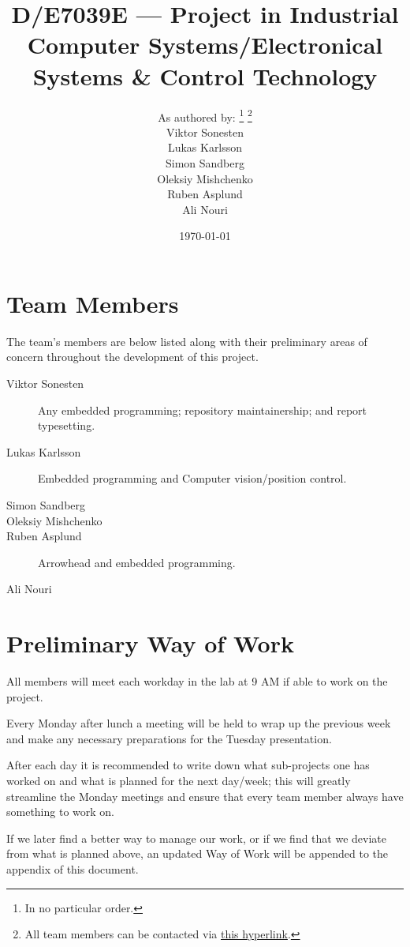 \documentclass[twocolumn]{article}
\title{D/E7039E --- Project in Industrial Computer Systems/Electronical Systems \& Control Technology}
\author{
As authored by:
\footnote{In no particular order.}
\footnote{All team members can be contacted via
\href{mailto:vikson-6@student.ltu.se;lukkar-4@student.ltu.se;simpen-1@student.ltu.se;olemis-6@student.ltu.se;rubasp-6@student.ltu.se;alinou-6@student.ltu.se}{this hyperlink}.} \\
Viktor Sonesten \hypermail{vikson-6@student.ltu.se} \\
Lukas Karlsson \hypermail{lukkar-4@student.ltu.se} \\
Simon Sandberg \hypermail{simpen-1@student.ltu.se} \\
Oleksiy Mishchenko \hypermail{olemis-6@student.ltu.se} \\
Ruben Asplund \hypermail{rubasp-6@student.ltu.se} \\
Ali Nouri \hypermail{alinou-6@student.ltu.se}
}
\date{\today}
\begin{document}
\maketitle

\appendix
\section{Team Members}
The team's members are below listed along with their preliminary areas of concern throughout the development of this project.

\begin{description}
    \item[Viktor Sonesten]
    Any embedded programming;
    repository maintainership; and
    report typesetting.

    \item[Lukas Karlsson]
    Embedded programming and
    Computer vision/position control.
    \item[Simon Sandberg]
    \item[Oleksiy Mishchenko]
    \item[Ruben Asplund]
    Arrowhead and embedded programming.
    \item[Ali Nouri]
\end{description}

\section{Preliminary Way of Work}
All members will meet each workday in the lab at 9 AM if able to work on the project.

Every Monday after lunch a meeting will be held to wrap up the previous week and make any necessary preparations for the Tuesday presentation.

After each day it is recommended to write down what sub-projects one has worked on and what is planned for the next day/week;
this will greatly streamline the Monday meetings and ensure that every team member always have something to work on.

If we later find a better way to manage our work,
or if we find that we deviate from what is planned above,
an updated Way of Work will be appended to the appendix of this document.
\end{document}

